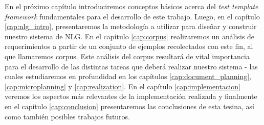 En el próximo capítulo introduciremos conceptos básicos acerca del \textit{test template framework} fundamentales para el desarrollo de este trabajo. Luego, en el capítulo \ref{cap:nlg_intro}, presentaremos la metodología a utilizar para diseñar y construir nuestro sistema de NLG. En el capítulo \ref{cap:corpus} realizaremos un análisis de requerimientos a partir de un conjunto de ejemplos recolectados con este fin, al que llamaremos corpus. Este análisis del corpus resultará de vital importancia para el desarrollo de las distintas tareas que deberá realizar nuestro sistema - las cuales estudiaremos en profundidad en los capítulos \ref{cap:document_planning}, \ref{cap:microplanning} y \ref{cap:realization}. En el capítulo \ref{cap:implementacion} veremos los aspectos más relevantes de la implementación realizada y finalmente en el capítulo \ref{cap:conclusion} presentaremos las conclusiones de esta tesina, así como también posibles trabajos futuros.